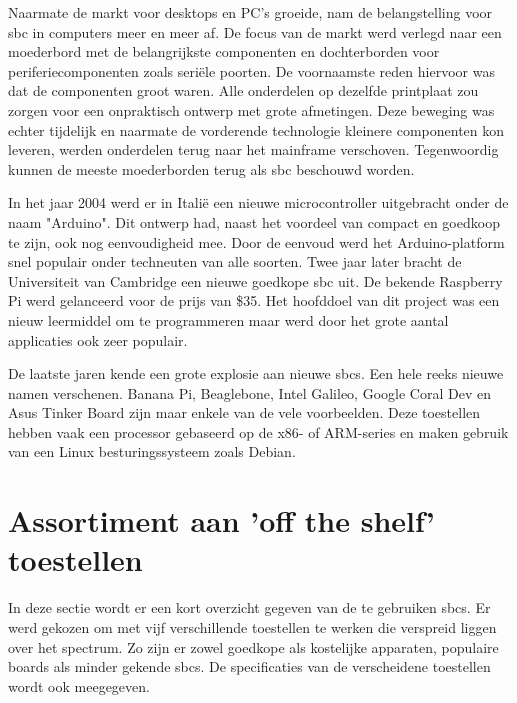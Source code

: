 	Naarmate de markt voor desktops en PC's groeide, nam de belangstelling voor \gls{sbc} in computers meer en meer af. De focus van de markt werd verlegd naar een moederbord met de belangrijkste componenten en dochterborden voor periferiecomponenten zoals seri\"ele poorten. De voornaamste reden hiervoor was dat de componenten groot waren. Alle onderdelen op dezelfde printplaat zou zorgen voor een onpraktisch ontwerp met grote afmetingen. Deze beweging was echter tijdelijk en naarmate de vorderende technologie kleinere componenten kon leveren, werden onderdelen terug naar het mainframe verschoven. Tegenwoordig kunnen de meeste moederborden terug als \gls{sbc} beschouwd worden. 

	
	In het jaar 2004 werd er in Itali\"e een nieuwe microcontroller uitgebracht onder de naam "Arduino". Dit ontwerp had, naast het voordeel van compact en goedkoop te zijn, ook nog eenvoudigheid mee. Door de eenvoud werd het Arduino-platform snel populair onder techneuten van alle soorten. 
	Twee jaar later bracht de Universiteit van Cambridge een nieuwe goedkope \gls{sbc} uit. De bekende Raspberry Pi werd gelanceerd voor de prijs van \$35. Het hoofddoel van dit project was een nieuw leermiddel om te programmeren maar werd door het grote aantal applicaties ook zeer populair. \label{raspberry}
	
	De laatste jaren kende een grote explosie aan nieuwe \gls{sbc}s. Een hele reeks nieuwe namen verschenen. Banana Pi, Beaglebone, Intel Galileo, Google Coral Dev en Asus Tinker Board zijn maar enkele van de vele voorbeelden. Deze toestellen hebben vaak een processor gebaseerd op de x86- of ARM-series en maken gebruik van een Linux besturingssysteem zoals Debian.
	


\newpage


\section{Assortiment aan 'off the shelf' toestellen}
In deze sectie wordt er een kort overzicht gegeven van de te gebruiken \gls{sbc}s. Er werd gekozen om met vijf verschillende toestellen te werken die verspreid liggen over het spectrum. Zo zijn er zowel goedkope als kostelijke apparaten, populaire boards als minder gekende \gls{sbc}s. De specificaties van de verscheidene toestellen wordt ook meegegeven.
